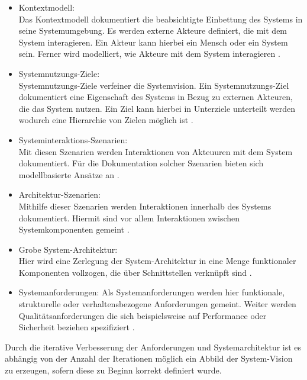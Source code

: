 \begin{itemize}
\item Kontextmodell:\\
Das Kontextmodell dokumentiert die beabsichtigte Einbettung des Systems in seine Systemumgebung. Es werden externe Akteure definiert, die mit dem System interagieren. Ein Akteur kann hierbei ein Mensch oder ein System sein. Ferner wird modelliert, wie Akteure mit dem System interagieren \cite{Poh01}.
\item Systemnutzungs-Ziele:\\
Systemnutzungs-Ziele verfeiner die Systemvision. Ein Systemnutzungs-Ziel dokumentiert eine Eigenschaft des Systems in Bezug zu externen Akteuren, die das System nutzen. Ein Ziel kann hierbei in Unterziele unterteilt werden wodurch eine Hierarchie von Zielen möglich ist \cite{Poh01}.  
\item Systeminteraktions-Szenarien:\\
Mit diesen Szenarien werden Interaktionen von Akteuuren mit dem System dokumentiert. Für die Dokumentation solcher Szenarien bieten sich modellbasierte Ansätze an \cite{Poh01}.
\item Architektur-Szenarien:\\
Mithilfe dieser Szenarien werden Interaktionen innerhalb des Systems dokumentiert. Hiermit sind vor allem Interaktionen zwischen Systemkomponenten gemeint \cite{Poh01}. 
\item Grobe System-Architektur:\\
Hier wird eine Zerlegung der System-Architektur in eine Menge funktionaler Komponenten vollzogen, die über Schnittstellen verknüpft sind \cite{Poh01}.
\item Systemanforderungen:
Als Systemanforderungen werden hier funktionale, strukturelle oder verhaltensbezogene Anforderungen gemeint. Weiter werden Qualitätsanforderungen die sich beispielsweise auf Performance oder Sicherheit beziehen spezifiziert \cite{Poh01}.\\
\end{itemize}

Durch die iterative Verbesserung der Anforderungen und Systemarchitektur ist es abhängig von der Anzahl der Iterationen möglich ein Abbild der System-Vision zu erzeugen, sofern diese zu Beginn korrekt definiert wurde.